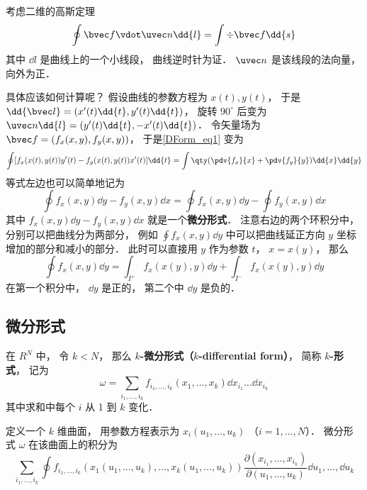 
\begin{issues}
\issueDraft
\end{issues}


考虑二维的高斯定理
\begin{equation}\label{DForm_eq1}
\oint \bvec f \vdot \uvec n \dd{l} = \int \div \bvec f \dd{s}
\end{equation}
其中 $\dd{l}$ 是曲线上的一个小线段， 曲线逆时针为证． $\uvec n$ 是该线段的法向量， 向外为正．

具体应该如何计算呢？ 假设曲线的参数方程为 $x(t), y(t)$， 于是 $\dd{\bvec l} = (x'(t)\dd{t}, y'(t)\dd{t})$， 旋转 $90^\circ$ 后变为 $\uvec n \dd{l} = (y'(t)\dd{t}, -x'(t)\dd{t})$． 令矢量场为 $\bvec f = (f_x(x,y), f_y(x,y))$， 于是\autoref{DForm_eq1} 变为
\begin{equation}
\oint [f_x(x(t),y(t)) y'(t) - f_y(x(t),y(t)) x'(t)]\dd{t}
= \int \qty(\pdv{f_x}{x} + \pdv{f_y}{y}) \dd{x}\dd{y}
\end{equation}
等式左边也可以简单地记为
\begin{equation}
\oint f_x(x,y) \dd{y} - f_y(x,y) \dd{x} = \oint f_x(x,y) \dd{y} - \oint f_y(x,y) \dd{x}
\end{equation}
其中 $f_x(x,y) \dd{y} - f_y(x,y) \dd{x}$ 就是一个\textbf{微分形式}． 注意右边的两个环积分中， 分别可以把曲线分为两部分， 例如 $\oint f_x(x,y) \dd{y}$ 中可以把曲线延正方向 $y$ 坐标增加的部分和减小的部分． 此时可以直接用 $y$ 作为参数 $t$， $x = x(y)$， 那么
\begin{equation}
\oint f_x(x,y) \dd{y} = \int_{I^+} f_x(x(y),y) \dd{y} + \int_{I^-} f_x(x(y),y) \dd{y}
\end{equation}
在第一个积分中， $\dd{y}$ 是正的， 第二个中 $\dd{y}$ 是负的．

\subsection{微分形式}
在 $R^N$ 中， 令 $k < N$， 那么 \textbf{$k$-微分形式（$k$-differential form）}， 简称 \textbf{$k$-形式}， 记为
\begin{equation}
\omega = \sum_{i_1,\dots,i_k} f_{i_1,\dots,i_k}(x_1,\dots,x_k) \dd{x_{i_1}}\dots\dd{x_{i_k}}
\end{equation}
其中求和中每个 $i$ 从 1 到 $k$ 变化．

定义一个 $k$ 维曲面， 用参数方程表示为 $x_i(u_1,\dots,u_k)$ （$i=1,\dots,N$）． 微分形式 $\omega$ 在该曲面上的积分为
\begin{equation}
\sum_{i_1,\dots,i_k} \oint f_{i_1,\dots,i_k}(x_1(u_1,\dots,u_k),\dots,x_k(u_1,\dots,u_k)) \frac{\partial(x_{i_1},\dots,x_{i_k})}{\partial(u_1,\dots,u_k)} \dd{u_1},\dots,\dd{u_k}
\end{equation}


